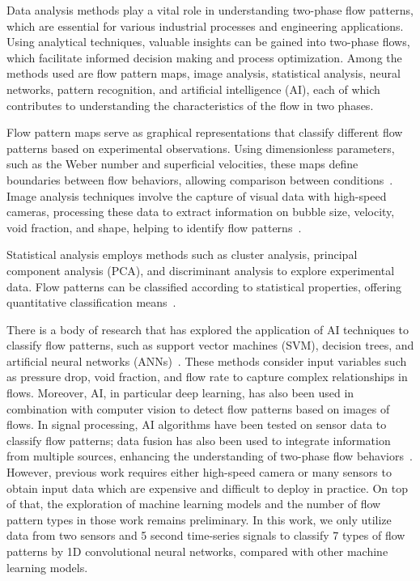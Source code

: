 Data analysis methods play a vital role in understanding two-phase flow patterns, which are essential for various industrial processes and engineering applications. Using analytical techniques, valuable insights can be gained into two-phase flows, which facilitate informed decision making and process optimization. Among the methods used are flow pattern maps, image analysis, statistical analysis, neural networks, pattern recognition, and artificial intelligence (AI), each of which contributes to understanding the characteristics of the flow in two phases.

Flow pattern maps serve as graphical representations that classify different flow patterns based on experimental observations. Using dimensionless parameters, such as the Weber number and superficial velocities, these maps define boundaries between flow behaviors, allowing comparison between conditions~\cite{songsiri2004tow,barnea1986transition,mandhane1974flow,spedding1980regime,stanislav1986intermittent}. Image analysis techniques involve the capture of visual data with high-speed cameras, processing these data to extract information on bubble size, velocity, void fraction, and shape, helping to identify flow patterns~\cite{al2020systematic,al2020bsimplified,al2008development,almutairi2020ect}.

Statistical analysis employs methods such as cluster analysis, principal component analysis (PCA), and discriminant analysis to explore experimental data. Flow patterns can be classified according to statistical properties, offering quantitative classification means~\cite{al2020systematic,van2001evolution,nydal1992statistical,matsumoto1984statistical,chakraborty2020characterisation,ameel2012classification,yang2017application,nie2022image,trafalis2005two}. 

There is a body of research that has explored the application of AI techniques to classify flow patterns, such as support vector machines (SVM), decision trees, and artificial neural networks (ANNs)~\cite{nie2022image,trafalis2005two,sun2023comparative,li2023gas,howard2007pattern,mi1998vertical,hernandez2006fast,xie2003flow,xie2004artificial,chakraborty2020characterisation,yang2017application}. These methods consider input variables such as pressure drop, void fraction, and flow rate to capture complex relationships in flows. Moreover, AI, in particular deep learning, has also been used in combination with computer vision to detect flow patterns based on images of flows. In signal processing, AI algorithms have been tested on sensor data to classify flow patterns; data fusion has also been used to integrate information from multiple sources, enhancing the understanding of two-phase flow behaviors~\cite{klein2004sensor,hall1997introduction,zhang2014data,barbariol2020sensor}. However, previous work requires either high-speed camera or many sensors to obtain input data which are expensive and difficult to deploy in practice. On top of that, the exploration of machine learning models and the number of flow pattern types in those work remains preliminary. In this work, we only utilize data from two sensors and 5 second time-series signals to classify 7 types of flow patterns by 1D convolutional neural networks, compared with other machine learning models.


